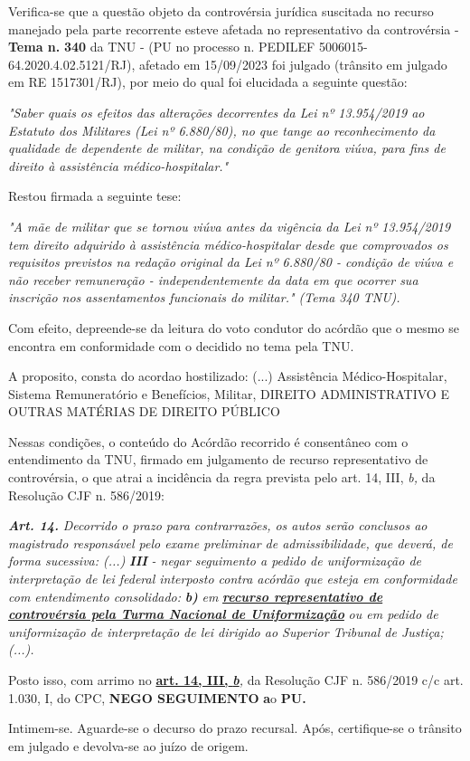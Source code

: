 \documentclass[12pt]{article}
\begin{document}
\justifying
\noindent Verifica-se que a questão objeto da controvérsia jurídica suscitada no recurso manejado pela parte recorrente esteve afetada no representativo da controvérsia - \textbf{Tema n. }\textbf{340} da TNU - (PU no processo n. PEDILEF 5006015-64.2020.4.02.5121/RJ),  afetado em 15/09/2023 foi julgado (trânsito em julgado em RE 1517301/RJ), por meio do qual foi elucidada a seguinte questão:

\noindent \textit{"Saber quais os efeitos das alterações decorrentes da Lei nº 13.954/2019 ao Estatuto dos Militares (Lei nº 6.880/80), no que tange ao reconhecimento da qualidade de dependente de militar, na condição de genitora viúva, para fins de direito à assistência médico-hospitalar."}

\noindent Restou firmada a seguinte tese:

\noindent \textit{"A mãe de militar que se tornou viúva antes da vigência da Lei nº 13.954/2019 tem direito adquirido à assistência médico-hospitalar desde que comprovados os requisitos previstos na redação original da Lei nº 6.880/80 - condição de viúva e não receber remuneração - independentemente da data em que ocorrer sua inscrição nos assentamentos funcionais do militar." (Tema 340 TNU).}

\noindent Com efeito, depreende-se da leitura do voto condutor do acórdão que o mesmo se encontra em conformidade com o decidido no  tema pela TNU.

\noindent A proposito, consta do acordao hostilizado: (...) Assistência Médico-Hospitalar, Sistema Remuneratório e Benefícios, Militar, DIREITO ADMINISTRATIVO E OUTRAS MATÉRIAS DE DIREITO PÚBLICO

\noindent Nessas condições, o conteúdo do Acórdão recorrido é consentâneo com o entendimento da TNU, firmado em julgamento de recurso representativo de controvérsia, o que atrai a incidência da regra prevista pelo art. 14, III, \textit{b,} da Resolução CJF n. 586/2019:

\noindent \textit{\textbf{Art. 14.}}\textit{ Decorrido o prazo para contrarrazões, os autos serão conclusos ao magistrado responsável pelo exame preliminar de admissibilidade, que deverá, de forma sucessiva: (...) }\textit{\textbf{III }}\textit{- negar seguimento a pedido de uniformização de interpretação de lei federal interposto contra acórdão que esteja em conformidade com entendimento consolidado: }\textit{\textbf{b)}}\textit{ em }\uline{\textit{\textbf{recurso representativo de controvérsia pela Turma Nacional de Uniformização}}}\textit{ ou em pedido de uniformização de interpretação de lei dirigido ao Superior Tribunal de Justiça;(...).}

\noindent Posto isso, com arrimo no \uline{\textbf{art. 14, III, }}\uline{\textit{\textbf{b}}}\textit{,} da Resolução CJF n. 586/2019 c/c art. 1.030, I, do CPC, \textbf{NEGO SEGUIMENTO }\textbf{a}o\textbf{ PU}\textbf{.}

\noindent Intimem-se. Aguarde-se o decurso do prazo recursal. Após, certifique-se o trânsito em julgado e devolva-se ao juízo de origem.
\end{document}
